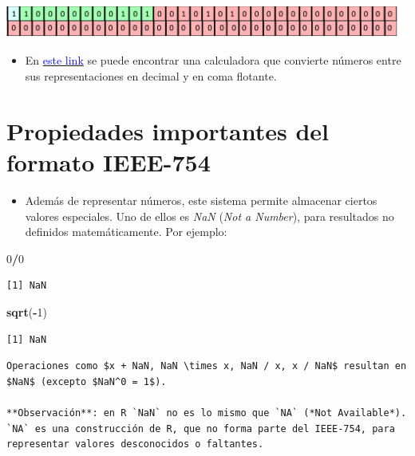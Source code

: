 \documentclass[]{book}
\newenvironment{Shaded}{\begin{snugshade}}{\end{snugshade}}
\newcommand{\DecValTok}[1]{\textcolor[rgb]{0.00,0.00,0.81}{#1}}
\newcommand{\KeywordTok}[1]{\textcolor[rgb]{0.13,0.29,0.53}{\textbf{#1}}}
\newcommand{\NormalTok}[1]{#1}
\newcommand{\OperatorTok}[1]{\textcolor[rgb]{0.81,0.36,0.00}{\textbf{#1}}}
\providecommand{\tightlist}{%
  \setlength{\itemsep}{0pt}\setlength{\parskip}{0pt}}
\begin{document}
\begin{center}\includegraphics[width=1\linewidth]{Plots/U1/floatej} \end{center}

\begin{itemize}
\tightlist
\item
  En \href{http://weitz.de/ieee/}{\textcolor{blue}{este link}} se puede encontrar una calculadora que convierte números entre sus representaciones en decimal y en coma flotante.
\end{itemize}

\hypertarget{propiedades-importantes-del-formato-ieee-754}{%
\section{Propiedades importantes del formato IEEE-754}\label{propiedades-importantes-del-formato-ieee-754}}

\begin{itemize}
\tightlist
\item
  Además de representar números, este sistema permite almacenar ciertos valores especiales. Uno de ellos es \emph{NaN} (\emph{Not a Number}), para resultados no definidos matemáticamente. Por ejemplo:
\end{itemize}

\begin{Shaded}
\begin{Highlighting}[]
\DecValTok{0}\OperatorTok{/}\DecValTok{0}
\end{Highlighting}
\end{Shaded}

\begin{verbatim}
[1] NaN
\end{verbatim}

\begin{Shaded}
\begin{Highlighting}[]
\KeywordTok{sqrt}\NormalTok{(}\OperatorTok{-}\DecValTok{1}\NormalTok{)}
\end{Highlighting}
\end{Shaded}

\begin{verbatim}
[1] NaN
\end{verbatim}

\begin{verbatim}
Operaciones como $x + NaN, NaN \times x, NaN / x, x / NaN$ resultan en $NaN$ (excepto $NaN^0 = 1$).

**Observación**: en R `NaN` no es lo mismo que `NA` (*Not Available*). `NA` es una construcción de R, que no forma parte del IEEE-754, para representar valores desconocidos o faltantes.
\end{verbatim}
\end{document}
